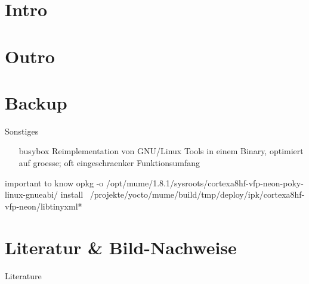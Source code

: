 




\frame{\titlepage}

\section*{Intro}




\section*{Outro}


{
\appendix

\section{Backup}



\begin{frame}{Sonstiges}
	\begin{itemize}
		\item[busybox] Reimplementation von GNU/Linux Tools in einem Binary, optimiert auf groesse; oft eingeschraenker Funktionsumfang
	\end{itemize}
\end{frame}

\begin{frame}{important to know}
opkg -o /opt/mume/1.8.1/sysroots/cortexa8hf-vfp-neon-poky-linux-gnueabi/ install ~/projekte/yocto/mume/build/tmp/deploy/ipk/cortexa8hf-vfp-neon/libtinyxml*
\end{frame}

\section{Literatur \& Bild-Nachweise}
\begin{frame}[allowframebreaks]{Literature}
	\tiny{
		
	}
\end{frame}

}


